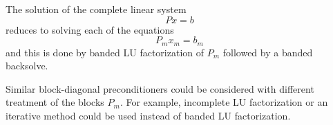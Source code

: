 {The solution of the complete linear system
\begin{equation}
  Px = b
\end{equation}
reduces to solving each of the equations
\begin{equation}
  P_m x_m = b_m
\end{equation}
and this is done by banded LU factorization of $P_m$ followed by a banded
backsolve.

Similar block-diagonal preconditioners could be considered with different
treatment of the blocks $P_m$. For example, incomplete LU factorization or
an iterative method could be used instead of banded LU factorization.


}
